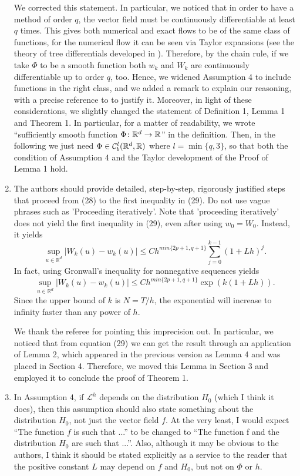 \documentclass[10pt]{article}
\begin{document}
\begin{enumerate}
\begin{itquote}{}
	\end{itquote}
	We corrected this statement. In particular, we noticed that in order to have a method of order $q$, the vector field must be continuously differentiable at least $q$ times. This gives both numerical and exact flows to be of the same class of functions, for the numerical flow it can be seen via Taylor expansions (see the theory of tree differentials developed in \cite[Chapter II]{HNW93}). Therefore, by the chain rule, if we take $\Phi$ to be a smooth function both $w_k$ and $W_k$ are continuously differentiable up to order $q$, too. Hence, we widened Assumption 4 to include functions in the right class, and we added a remark to explain our reasoning, with a precise reference to \cite[Theorem II.3.1]{HNW93} to justify it. Moreover, in light of these considerations, we slightly changed the statement of Definition 1, Lemma 1 and Theorem 1. In particular, for a matter of readability, we wrote ``sufficiently smooth function $\Phi\colon\mathbb{R}^d\to\mathbb{R}$'' in the definition. Then, in the following we just need $\Phi \in \mathcal C^l_b(\mathbb{R}^d, \mathbb{R})$ where $l = \min\{q, 3\}$, so that both the condition of Assumption 4 and the Taylor development of the Proof of Lemma 1 hold.
	\item 
	\begin{itquote} 
		{} The authors should provide detailed, step-by-step, rigorously justified steps that proceed from (28) to the first inequality in (29). Do not use vague phrases such as 'Proceeding iteratively'. Note that 'proceeding iteratively' does not yield the first inequality in (29), even after using $w_0=W_0$. Instead, it yields $$\sup_{u\in\mathbb{R}^d}\vert W_k(u)-w_k(u)\vert \leq Ch^{min\{2p+1,q+1\}}\sum_{j=0}^{k-1}(1+Lh)^j.$$ In fact, using Gronwall's inequality for nonnegative sequences yields $$\sup_{u\in\mathbb{R}^d}\vert W_k(u)-w_k(u)\vert \leq Ch^{min\{2p+1,q+1\}}\exp\left(k(1+Lh)\right).$$ Since the upper bound of $k$ is $N=T/h$, the exponential will increase to infinity faster than any power of $h$.
	\end{itquote}
	We thank the referee for pointing this imprecision out. In particular, we noticed that from equation (29) we can get the result through an application of Lemma 2, which appeared in the previous version as Lemma 4 and was placed in Section 4. Therefore, we moved this Lemma in Section 3 and employed it to conclude the proof of Theorem 1.
	\item 
	\begin{itquote} 
		In Assumption 4, if $\mathcal{L}^h$ depends on the distribution $H_0$ (which I think it does), then this assumption should also state something about the distribution $H_0$, not just the vector field $f$. At the very least, I would expect ``The function $f$ is such that ...'' to be changed to ``The function f and the distribution $H_0$ are such that ...''. Also, although it may be obvious to the authors, I think it should be stated explicitly as a service to the reader that the positive constant $L$ may depend on $f$ and $H_0$, but not on $\Phi$ or $h$.

\end{itquote}
\end{enumerate}
\end{document}
